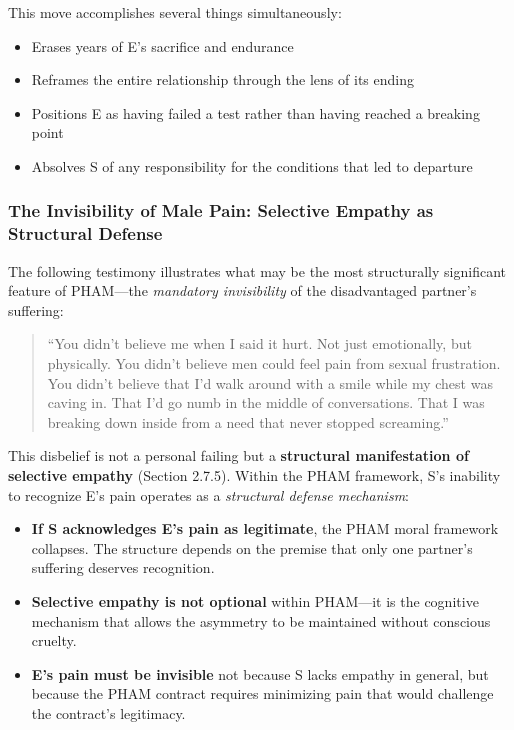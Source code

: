 \documentclass[12pt, letterpaper]{article}
\begin{document}
This move accomplishes several things simultaneously:
\begin{itemize}
    \item Erases years of E's sacrifice and endurance
    \item Reframes the entire relationship through the lens of its ending
    \item Positions E as having failed a test rather than having reached a breaking point
    \item Absolves S of any responsibility for the conditions that led to departure
\end{itemize}

\subsubsection{The Invisibility of Male Pain: Selective Empathy as Structural Defense}

The following testimony illustrates what may be the most structurally significant feature of PHAM---the \textit{mandatory invisibility} of the disadvantaged partner's suffering:

\begin{quote}
``You didn't believe me when I said it hurt. Not just emotionally, but physically. You didn't believe men could feel pain from sexual frustration. You didn't believe that I'd walk around with a smile while my chest was caving in. That I'd go numb in the middle of conversations. That I was breaking down inside from a need that never stopped screaming.''
\end{quote}

This disbelief is not a personal failing but a \textbf{structural manifestation of selective empathy} (Section 2.7.5). Within the PHAM framework, S's inability to recognize E's pain operates as a \textit{structural defense mechanism}:

\begin{itemize}
    \item \textbf{If S acknowledges E's pain as legitimate}, the PHAM moral framework collapses. The structure depends on the premise that only one partner's suffering deserves recognition.
    \item \textbf{Selective empathy is not optional} within PHAM---it is the cognitive mechanism that allows the asymmetry to be maintained without conscious cruelty.
    \item \textbf{E's pain must be invisible} not because S lacks empathy in general, but because the PHAM contract requires minimizing pain that would challenge the contract's legitimacy.
\end{itemize}
\end{document}

